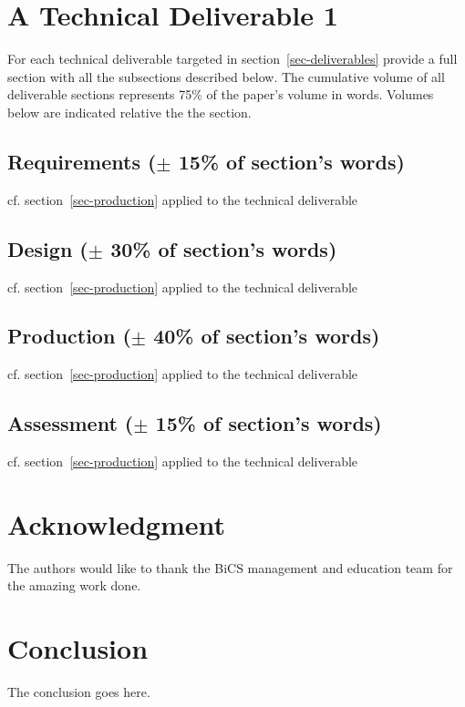 \documentclass[conference,compsoc]{IEEEtran}
\begin{document}
\section{ A Technical Deliverable 1}
For each technical deliverable targeted in section~\ref{sec-deliverables} provide a full section with all the subsections described below.
The cumulative volume of all deliverable sections represents 75\% of the paper's volume in words. Volumes below are indicated relative the the section.
\label{sec-production}
\subsection{Requirements ($\pm$ 15\% of section's words)}
cf. section~\ref{sec-production} applied to the technical deliverable
\subsection{Design ($\pm$ 30\% of section's words)}
cf. section~\ref{sec-production} applied to the technical deliverable
\subsection{Production ($\pm$ 40\% of section's words)}
cf. section~\ref{sec-production} applied to the technical deliverable
\subsection{Assessment ($\pm$ 15\% of section's words)}
cf. section~\ref{sec-production} applied to the technical deliverable


\section*{Acknowledgment}
The authors would like to thank the BiCS management and education team for the amazing work done.


\section{Conclusion}
The conclusion goes here.

%
%
\end{document}
